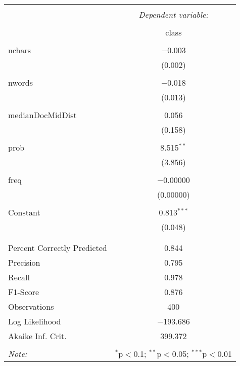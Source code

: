 
\begin{table}[!htbp] \centering 
  \caption{} 
  \label{} 
\begin{tabular}{@{\extracolsep{5pt}}lc} 
\\[-1.8ex]\hline 
\hline \\[-1.8ex] 
 & \multicolumn{1}{c}{\textit{Dependent variable:}} \\ 
\cline{2-2} 
\\[-1.8ex] & class \\ 
\hline \\[-1.8ex] 
 nchars & $-$0.003 \\ 
  & (0.002) \\ 
  & \\ 
 nwords & $-$0.018 \\ 
  & (0.013) \\ 
  & \\ 
 medianDocMidDist & 0.056 \\ 
  & (0.158) \\ 
  & \\ 
 prob & 8.515$^{**}$ \\ 
  & (3.856) \\ 
  & \\ 
 freq & $-$0.00000 \\ 
  & (0.00000) \\ 
  & \\ 
 Constant & 0.813$^{***}$ \\ 
  & (0.048) \\ 
  & \\ 
\hline \\[-1.8ex] 
Percent Correctly Predicted & 0.844 \\ 
Precision & 0.795 \\ 
Recall & 0.978 \\ 
F1-Score & 0.876 \\ 
Observations & 400 \\ 
Log Likelihood & $-$193.686 \\ 
Akaike Inf. Crit. & 399.372 \\ 
\hline 
\hline \\[-1.8ex] 
\textit{Note:}  & \multicolumn{1}{r}{$^{*}$p$<$0.1; $^{**}$p$<$0.05; $^{***}$p$<$0.01} \\ 
\end{tabular} 
\end{table} 
